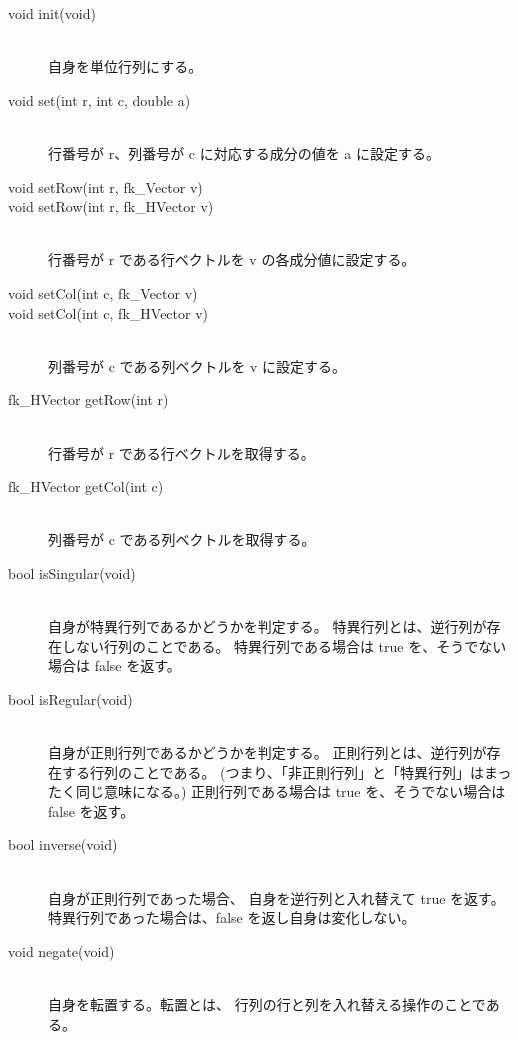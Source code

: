 \begin{description}
\item[void init(void)] ~ \\
自身を単位行列にする。\\

\item[void set(int r, int c, double a)] ~ \\
行番号が r、列番号が c に対応する成分の値を a に設定する。\\

\item[void setRow(int r, fk\_Vector v)]
\item[void setRow(int r, fk\_HVector v)] ~ \\
行番号が r である行ベクトルを v の各成分値に設定する。\\

\item[void setCol(int c, fk\_Vector v)]
\item[void setCol(int c, fk\_HVector v)] ~ \\
列番号が c である列ベクトルを v に設定する。\\

\item[fk\_HVector getRow(int r)] ~ \\
行番号が r である行ベクトルを取得する。\\

\item[fk\_HVector getCol(int c)] ~ \\
列番号が c である列ベクトルを取得する。\\

\item[bool isSingular(void)] ~ \\
自身が特異行列であるかどうかを判定する。
特異行列とは、逆行列が存在しない行列のことである。
特異行列である場合は true を、そうでない場合は false を返す。\\

\item[bool isRegular(void)] ~ \\
自身が正則行列であるかどうかを判定する。
正則行列とは、逆行列が存在する行列のことである。
(つまり、「非正則行列」と「特異行列」はまったく同じ意味になる。)
正則行列である場合は true を、そうでない場合は false を返す。\\

\item[bool inverse(void)] ~ \\
自身が正則行列であった場合、
自身を逆行列と入れ替えて true を返す。
特異行列であった場合は、false を返し自身は変化しない。\\

\item[void negate(void)] ~ \\
自身を転置する。転置とは、
行列の行と列を入れ替える操作のことである。
\end{description}

